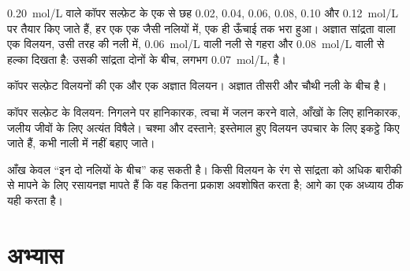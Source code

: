 \begin{example}[नीली श्रेणी]\label{ex:g10:concentration-and-dilution:scale}
\qty{0.20}{mol/L} वाले कॉपर सल्फ़ेट के एक  से छह 
0.02, 0.04, 0.06, 0.08, 0.10 और \qty{0.12}{mol/L} पर तैयार किए जाते हैं, हर
एक एक जैसी नलियों में, एक ही ऊँचाई तक भरा हुआ। अज्ञात सांद्रता वाला एक विलयन,
उसी तरह की नली में, \qty{0.06}{mol/L} वाली नली से गहरा और
\qty{0.08}{mol/L} वाली से हल्का दिखता है: उसकी सांद्रता दोनों के बीच, लगभग
\qty{0.07}{mol/L}, है।
\end{example}

\begin{omfigure}

{\small कॉपर सल्फ़ेट विलयनों की एक  और एक अज्ञात
विलयन। अज्ञात तीसरी और चौथी नली के बीच है।}
\end{omfigure}

\begin{safety}{}
कॉपर सल्फ़ेट के विलयन: निगलने पर हानिकारक, त्वचा में जलन करने वाले, आँखों के लिए
हानिकारक, जलीय जीवों के लिए अत्यंत विषैले। चश्मा और दस्ताने; इस्तेमाल हुए विलयन
उपचार के लिए इकट्ठे किए जाते हैं, कभी नाली में नहीं बहाए जाते।
\end{safety}

\begin{remark}[आँख की सीमाएँ]\label{rem:g10:concentration-and-dilution:eye}
आँख केवल ``इन दो नलियों के बीच'' कह सकती है। किसी विलयन के रंग से सांद्रता को
अधिक बारीकी से मापने के लिए रसायनज्ञ मापते हैं कि वह कितना प्रकाश अवशोषित करता है;
आगे का एक अध्याय ठीक यही करता है।
\end{remark}

\section{अभ्यास}

